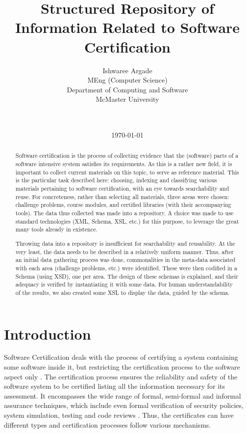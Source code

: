 \documentclass[11pt,letterpaper]{report}
\title{Structured Repository of Information Related to Software Certification}
\author{
        \normalsize
        Ishwaree Argade
            \mbox{}\\ %
        \normalsize MEng (Computer Science)
         \mbox{} \\
       \normalsize Department of Computing and Software 
                \mbox{}\\ %
        \normalsize McMaster University 
        \mbox{} \\
        \date{\today} \\
}
\begin{document}
\maketitle

\begin{abstract}

Software certification is the process of collecting evidence that the (software) parts of a software intensive system satisfies its requirements.  As this is a rather new field, it is important to collect current materials on this topic, to serve as reference material.  This is the particular task described here: choosing, indexing and classifying various materials pertaining to software certification, with an eye towards searchability and reuse.  For concreteness, rather than selecting all materials, three areas were chosen: challenge problems, course modules, and certified libraries (with their accompanying tools).  The data thus collected was made into a repository.  A choice was made to use standard technologies (XML, Schema, XSL, etc.) for this purpose, to leverage the great many tools already in existence.

Throwing data into a repository is insufficient for searchability and reusability.  At the very least, the data needs to be described in a relatively uniform manner.  Thus, after an initial data gathering process was done, commonalities in the meta-data associated with each area (challenge problems, etc.) were identified.  These were then codified in a Schema (using XSD), one per area.  The design of these schemas is explained, and their adequacy is verified by instantiating it with some data.  For human understandability of the results, we also created some XSL to display the data, guided by the schema.  
\end{abstract}

\setcounter{tocdepth}{2}
\tableofcontents

\chapter{Introduction}

Software Certification deals with the process of certifying a system containing some software inside it, but restricting the certification process to the software aspect only \cite{seminar}. The certification process ensures the reliability and safety of the software system to be certified listing all the information necessary for its assessment. It encompasses the wide range of formal, semi-formal and informal assurance techniques, which include even formal verification of security policies, system simulation, testing and code reviews \cite{SCMS}. Thus, the certificates can have different types and certification processes follow various mechanisms.
\end{document}
